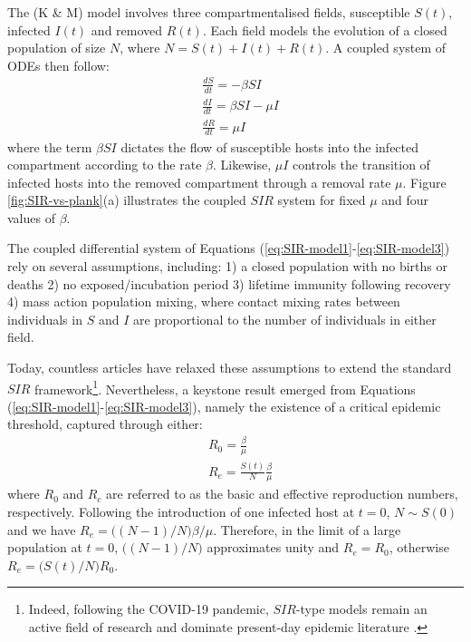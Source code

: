 The \cite{kermack-model} (K \& M) model involves three compartmentalised fields, 
susceptible $S(t)$, infected $I(t)$ and removed $R(t)$.
Each field models the evolution of a closed population of size $N$, where $N = S(t) + I(t) + R(t)$. 
A coupled system of ODEs then follow:
\begin{align}
\label{eq:SIR-model1}
    &\frac{dS}{dt} = -\beta SI \\
    &\frac{dI}{dt} = \beta SI - \mu I \\
    \label{eq:SIR-model3}
    &\frac{dR}{dt} = \mu I
\end{align}
where the term $\beta S I$ dictates the flow of susceptible hosts into the infected compartment according 
to the rate $\beta$. Likewise, $\mu I$ controls the transition of infected hosts into the removed compartment
through a removal rate $\mu$. Figure \ref{fig:SIR-vs-plank}(a) illustrates the coupled $SIR$ system for 
fixed $\mu$ and four values of $\beta$.

The coupled differential system of Equations (\ref{eq:SIR-model1}-\ref{eq:SIR-model3}) rely on several assumptions, including:
1) a closed population with no births or deaths 2) no exposed/incubation period 3) lifetime immunity following recovery
4) mass action population mixing, where contact mixing rates between individuals in $S$ and $I$ are proportional 
to the number of individuals in either field.

Today, countless articles have relaxed these assumptions to extend the standard $SIR$ framework\footnote{
Indeed, following the COVID-19 pandemic, $SIR$-type models remain an active field of research 
and dominate present-day epidemic literature \cite{atkeson2020using}.}.
Nevertheless, a keystone result emerged from Equations (\ref{eq:SIR-model1}-\ref{eq:SIR-model3}), namely 
the existence of a critical epidemic threshold, captured through either:
\begin{align}
    \label{eq:R0-SIR}
    & R_0 = \frac{\beta}{\mu}\\
    \label{eq:R0-effective}
    & R_e = \frac{S(t)}{N} \frac{\beta}{\mu}
\end{align}
where $R_0$ and $R_c$ are referred to as the basic and effective reproduction numbers, respectively.
Following the introduction of one infected host at $t=0$, $N\sim S(0)$ and 
we have $R_e=\big((N-1)/N\big) \beta / \mu$. Therefore, in the limit of a large population at $t=0$, 
$\big((N-1)/N\big)$ approximates unity and $R_e = R_0$, otherwise $R_e=\big(S(t)/N\big) R_0$.

